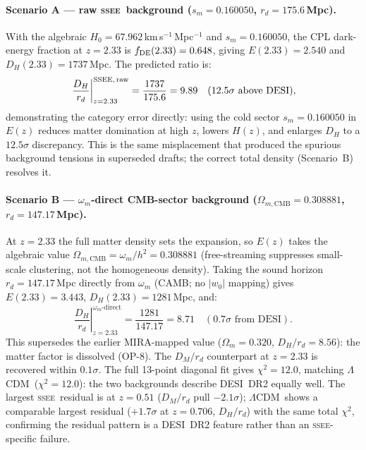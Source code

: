 \documentclass[12pt,a4paper]{article}
\newcommand{\SSEE}{\ifmmode\mathrm{SSEE}\else\textsc{ssee}\fi}
\newcommand{\LCDM}{\ifmmode\Lambda\mathrm{CDM}\else$\Lambda$CDM\fi}
\begin{document}
\paragraph{Scenario A — raw \SSEE\ background
($s_m=0.160050$, $r_d=175.6$\,Mpc).}
With the algebraic $H_0=67.962$\,km\,s$^{-1}$\,Mpc$^{-1}$ and
$s_m=0.160050$, the CPL dark-energy fraction at $z=2.33$ is
$f_{\rm DE}(2.33)=0.648$, giving $E(2.33)=2.540$ and
$D_H(2.33)=1737$\,Mpc.  The predicted ratio is:
\begin{equation}
  \left.\frac{D_H}{r_d}\right|_{z=2.33}^{\rm SSEE,\,raw}
  = \frac{1737}{175.6} = 9.89
  \quad (12.5\sigma \text{ above DESI}),
  \label{eq:lya_raw}
\end{equation}
demonstrating the category error directly: using the cold sector
$s_m=0.160050$ in $E(z)$ reduces matter domination at high $z$, lowers
$H(z)$, and enlarges $D_H$ to a $12.5\sigma$ discrepancy. This is the same
misplacement that produced the spurious background tensions in superseded
drafts; the correct total density (Scenario~B) resolves it.

\paragraph{Scenario B — $\omega_m$-direct CMB-sector background
($\Omega_{m,\mathrm{CMB}}=0.308881$, $r_d=147.17$\,Mpc).}
At $z=2.33$ the full matter density sets the expansion, so
$E(z)$ takes the algebraic value
$\Omega_{m,\mathrm{CMB}}=\omega_m/h^2=0.308881$ (free-streaming suppresses
small-scale clustering, not the homogeneous density). Taking the sound horizon
$r_d=147.17$\,Mpc directly from $\omega_m$ (CAMB; no $|w_0|$ mapping) gives
$E(2.33)=3.443$, $D_H(2.33)=1281$\,Mpc, and:
\begin{equation}
  \left.\frac{D_H}{r_d}\right|_{z=2.33}^{\omega_m\text{-direct}}
  = \frac{1281}{147.17} = 8.71
  \quad (0.7\sigma \text{ from DESI}).
  \label{eq:lya_mira}
\end{equation}
This supersedes the earlier MIRA-mapped value ($\Omega_m=0.320$, $D_H/r_d=8.56$):
the matter factor is dissolved (OP-8). The $D_M/r_d$ counterpart at $z=2.33$
is recovered within $0.1\sigma$. The full 13-point diagonal fit gives
$\chi^2=12.0$, matching \LCDM\ ($\chi^2=12.0$): the two backgrounds describe
DESI~DR2 equally well. The largest \SSEE\ residual is at $z=0.51$
($D_M/r_d$ pull $-2.1\sigma$); \LCDM\ shows a comparable largest residual
($+1.7\sigma$ at $z=0.706$, $D_H/r_d$) with the same total $\chi^2$, confirming
the residual pattern is a DESI~DR2 feature rather than an \SSEE-specific failure.
\end{document}
